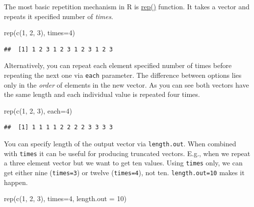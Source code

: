 \documentclass[
]{book}
\newenvironment{Shaded}{\begin{snugshade}}{\end{snugshade}}
\newcommand{\AttributeTok}[1]{\textcolor[rgb]{0.77,0.63,0.00}{#1}}
\newcommand{\DecValTok}[1]{\textcolor[rgb]{0.00,0.00,0.81}{#1}}
\newcommand{\FunctionTok}[1]{\textcolor[rgb]{0.00,0.00,0.00}{#1}}
\newcommand{\NormalTok}[1]{#1}
\begin{document}
The most basic repetition mechanism in R is \href{https://stat.ethz.ch/R-manual/R-devel/library/base/html/rep.html}{rep()} function. It takes a vector and repeats it specified number of \emph{times}.

\begin{Shaded}
\begin{Highlighting}[]
\FunctionTok{rep}\NormalTok{(}\FunctionTok{c}\NormalTok{(}\DecValTok{1}\NormalTok{, }\DecValTok{2}\NormalTok{, }\DecValTok{3}\NormalTok{), }\AttributeTok{times=}\DecValTok{4}\NormalTok{)}
\end{Highlighting}
\end{Shaded}

\begin{verbatim}
##  [1] 1 2 3 1 2 3 1 2 3 1 2 3
\end{verbatim}

Alternatively, you can repeat each element specified number of times before repeating the next one via \texttt{each} parameter. The difference between options lies only in the \emph{order} of elements in the new vector. As you can see both vectors have the same length and each individual value is repeated four times.

\begin{Shaded}
\begin{Highlighting}[]
\FunctionTok{rep}\NormalTok{(}\FunctionTok{c}\NormalTok{(}\DecValTok{1}\NormalTok{, }\DecValTok{2}\NormalTok{, }\DecValTok{3}\NormalTok{), }\AttributeTok{each=}\DecValTok{4}\NormalTok{)}
\end{Highlighting}
\end{Shaded}

\begin{verbatim}
##  [1] 1 1 1 1 2 2 2 2 3 3 3 3
\end{verbatim}

You can specify length of the output vector via \texttt{length.out}. When combined with \texttt{times} it can be useful for producing truncated vectors. E.g., when we repeat a three element vector but we want to get ten values. Using \texttt{times} only, we can get either nine (\texttt{times=3}) or twelve (\texttt{times=4}), not ten. \texttt{length.out=10} makes it happen.

\begin{Shaded}
\begin{Highlighting}[]
\FunctionTok{rep}\NormalTok{(}\FunctionTok{c}\NormalTok{(}\DecValTok{1}\NormalTok{, }\DecValTok{2}\NormalTok{, }\DecValTok{3}\NormalTok{), }\AttributeTok{times=}\DecValTok{4}\NormalTok{, }\AttributeTok{length.out =} \DecValTok{10}\NormalTok{)}
\end{Highlighting}
\end{Shaded}
\end{document}
